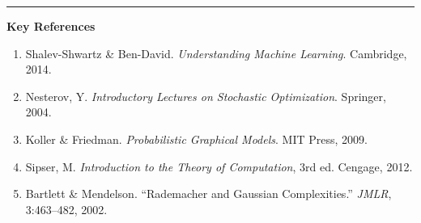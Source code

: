 \vspace{6pt}
\noindent\textcolor{rulecolor}{\rule{\linewidth}{0.8pt}}
{\small\bfseries\color{accent} Key References}\\[3pt]
{\small
\begin{enumerate}[leftmargin=1.8em, itemsep=1pt, topsep=0pt]
  \item Shalev-Shwartz \& Ben-David. \textit{Understanding Machine Learning}. Cambridge, 2014.
  \item Nesterov, Y. \textit{Introductory Lectures on Stochastic Optimization}. Springer, 2004.
  \item Koller \& Friedman. \textit{Probabilistic Graphical Models}. MIT Press, 2009.
  \item Sipser, M. \textit{Introduction to the Theory of Computation}, 3rd ed. Cengage, 2012.
  \item Bartlett \& Mendelson. ``Rademacher and Gaussian Complexities.'' \textit{JMLR}, 3:463--482, 2002.
\end{enumerate}
}
